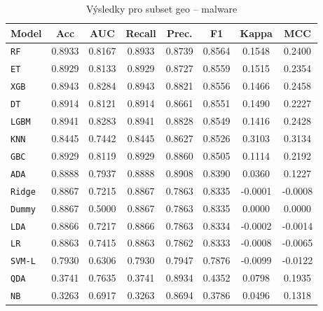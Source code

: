 \begin{table}[H]
  \centering
  \small
  \caption{Výsledky pro subset geo – malware}
  \begin{tabular}{|l|c|c|c|c|c|c|c|}
    \hline
    \textbf{Model} & \textbf{Acc} & \textbf{AUC} & \textbf{Recall} & \textbf{Prec.} & \textbf{F1} & \textbf{Kappa} & \textbf{MCC} \\
    \hline
    \texttt{RF} & 0.8933 & 0.8167 & 0.8933 & 0.8739 & 0.8564 & 0.1548 & 0.2400 \\
    \texttt{ET} & 0.8929 & 0.8133 & 0.8929 & 0.8727 & 0.8559 & 0.1515 & 0.2354 \\
    \texttt{XGB} & 0.8943 & 0.8284 & 0.8943 & 0.8821 & 0.8556 & 0.1466 & 0.2458 \\
    \texttt{DT} & 0.8914 & 0.8121 & 0.8914 & 0.8661 & 0.8551 & 0.1490 & 0.2227 \\
    \texttt{LGBM} & 0.8941 & 0.8283 & 0.8941 & 0.8828 & 0.8549 & 0.1416 & 0.2428 \\
    \texttt{KNN} & 0.8445 & 0.7442 & 0.8445 & 0.8627 & 0.8526 & 0.3103 & 0.3134 \\
    \texttt{GBC} & 0.8929 & 0.8119 & 0.8929 & 0.8860 & 0.8505 & 0.1114 & 0.2192 \\
    \texttt{ADA} & 0.8888 & 0.7937 & 0.8888 & 0.8908 & 0.8390 & 0.0360 & 0.1227 \\
    \texttt{Ridge} & 0.8867 & 0.7215 & 0.8867 & 0.7863 & 0.8335 & -0.0001 & -0.0008 \\
    \texttt{Dummy} & 0.8867 & 0.5000 & 0.8867 & 0.7863 & 0.8335 & 0.0000 & 0.0000 \\
    \texttt{LDA} & 0.8866 & 0.7217 & 0.8866 & 0.7863 & 0.8334 & -0.0002 & -0.0014 \\
    \texttt{LR} & 0.8863 & 0.7415 & 0.8863 & 0.7862 & 0.8333 & -0.0008 & -0.0065 \\
    \texttt{SVM-L} & 0.7930 & 0.6306 & 0.7930 & 0.7947 & 0.7876 & -0.0099 & -0.0122 \\
    \texttt{QDA} & 0.3741 & 0.7635 & 0.3741 & 0.8934 & 0.4352 & 0.0798 & 0.1935 \\
    \texttt{NB} & 0.3263 & 0.6917 & 0.3263 & 0.8694 & 0.3786 & 0.0496 & 0.1318 \\
    \hline
  \end{tabular}
\end{table}
\vspace{0.5cm}

